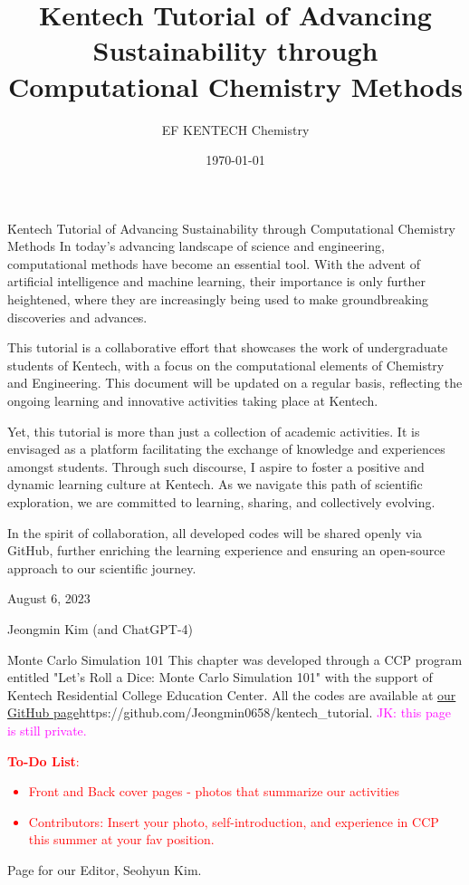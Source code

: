 \documentclass{textbook}
\title     {Kentech Tutorial of Advancing Sustainability through Computational Chemistry Methods}
\author     {EF KENTECH Chemistry}
\date       {\today}
\begin{document}
\h*{Kentech Tutorial of Advancing Sustainability through Computational Chemistry Methods} %
In today's advancing landscape of science and engineering,  computational methods have become an essential tool. With the advent of artificial intelligence and machine learning, their importance is only further heightened, where they are increasingly being used to make groundbreaking discoveries and advances.

This tutorial is a collaborative effort that showcases the work of undergraduate students of Kentech, with a focus on the computational elements of Chemistry and Engineering. This document will be updated on a regular basis, reflecting the ongoing learning and innovative activities taking place at Kentech.

Yet, this tutorial is more than just a collection of academic activities. It is envisaged as a platform facilitating the exchange of knowledge and experiences amongst students. Through such discourse, I aspire to foster a positive and dynamic learning culture at Kentech. As we navigate this path of scientific exploration, we are committed to learning, sharing, and collectively evolving.

In the spirit of collaboration, all developed codes will be shared openly via GitHub, further enriching the learning experience and ensuring an open-source approach to our scientific journey.

August 6, 2023

Jeongmin Kim (and ChatGPT-4)

\toc
\h{Monte Carlo Simulation 101}
This chapter was developed through a CCP program entitled "Let's Roll a Dice: Monte Carlo Simulation 101" with the support of Kentech Residential College Education Center.
All the codes are available at \url{our GitHub page}{https://github.com/Jeongmin0658/kentech_tutorial}. \textcolor{magenta}{JK: this page is still private.}

\textcolor{red}{\textbf{To-Do List}:
    \begin{itemize}
        \item Front and Back cover pages - photos that summarize our activities
        \item Contributors: Insert your photo, self-introduction, and experience in CCP this summer at your fav position.
    \end{itemize}
}

Page for our Editor, Seohyun Kim.
\end{document}
